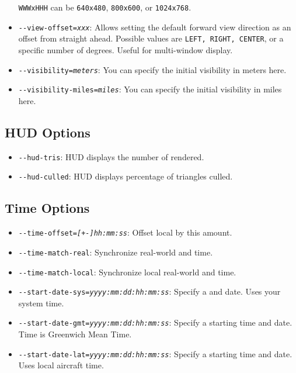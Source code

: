 \begin{itemize}
\texttt{WWWxHHH} can be \texttt{640x480}, \texttt{800x600}, or
\texttt{1024x768}.
\item{\texttt{-$ $-view-offset={\it xxx}}}: Allows setting the default forward view direction as an offset from straight
ahead. Possible values are \texttt{LEFT, RIGHT, CENTER}, or a specific number of degrees.
Useful for multi-window display.
\item{\texttt{-$ $-visibility={\it meters}}}: You can specify the initial visibility in meters here.
\item{\texttt{-$ $-visibility-miles={\it miles}}}: You can specify the initial visibility in miles here.
\end{itemize}

\subsection{HUD Options}
\begin{itemize}
\item{\texttt{-$ $-hud-tris}}: HUD displays the number of  rendered.
\item{\texttt{-$ $-hud-culled}}: HUD displays percentage of triangles culled.
\end{itemize}
\subsection{Time Options}
\begin{itemize}
\item{\texttt{-$ $-time-offset={\it [+-]hh:mm:ss}}}: Offset local  by this amount.
\item{\texttt{-$ $-time-match-real}}: Synchronize real-world and \FlightGear{} time.
\item{\texttt{-$ $-time-match-local}}: Synchronize local real-world and \FlightGear{} time.
\item{\texttt{-$ $-start-date-sys={\it yyyy:mm:dd:hh:mm:ss}}}: Specify a  and date. Uses your system time.
\item{\texttt{-$ $-start-date-gmt={\it yyyy:mm:dd:hh:mm:ss}}}: Specify a starting time and
date. Time is Greenwich Mean Time.
\item{\texttt{-$ $-start-date-lat={\it yyyy:mm:dd:hh:mm:ss}}}: Specify a starting time and
date. Uses local aircraft time.
\end{itemize}
